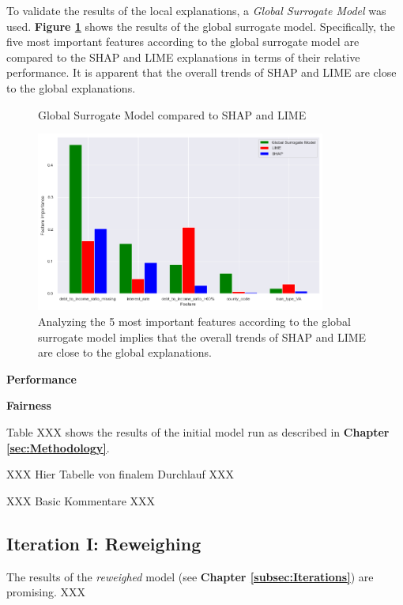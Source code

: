To validate the results of the local explanations, a \textit{Global Surrogate Model} was used. \textbf{Figure \ref{fig:Global_Surrogate}} shows the results of the global surrogate model. Specifically, the five most important features according to the global surrogate model are compared to the SHAP and LIME explanations in terms of their relative performance.
It is apparent that the overall trends of SHAP and LIME are close to the global explanations.

\begin{figure}[h]
    \centering
    \caption{Global Surrogate Model compared to SHAP and LIME}
    \includegraphics[width=0.85\textwidth]{images/CHXX_UPDATE_Surrogate_SHAP_LIME_combined.png}
    \caption*{Analyzing the 5 most important features according to the global surrogate model implies that the overall trends of SHAP and LIME are close to the global explanations.}
    \label{fig:Global_Surrogate}
\end{figure}

\textbf{Performance}


\textbf{Fairness}


Table XXX shows the results of the initial model run as described in \textbf{Chapter \ref{sec:Methodology}}.

XXX Hier Tabelle von finalem Durchlauf XXX

XXX Basic Kommentare XXX

\subsection{Iteration I: Reweighing}\label{subsec:Iteration_I}

The results of the \textit{reweighed} model (see \textbf{Chapter \ref{subsec:Iterations}}) are promising. XXX



